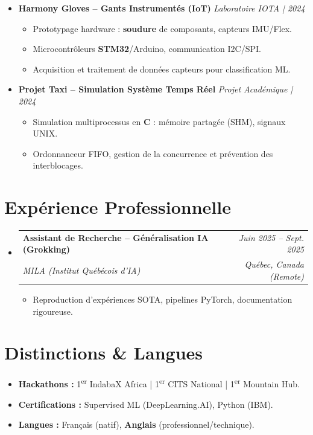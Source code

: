 \documentclass[a4paper,11pt]{article}
\makeatletter
\newcommand{\resumeSubheading}[4]{
  \vspace{-1pt}\item
    \begin{tabular*}{0.97\textwidth}[t]{l@{\extracolsep{\fill}}r}
      \textbf{#1} & \textit{\small #2} \\
      \textit{\small #3} & \textit{\small #4} \\
    \end{tabular*}\vspace{-5pt}
}
\makeatother
\begin{document}
\begin{itemize}[leftmargin=*, label={-}]
\item \textbf{Harmony Gloves -- Gants Instrumentés (IoT)} \hfill \textit{Laboratoire IOTA | 2024}
\vspace{-2pt}
    \begin{itemize}[leftmargin=0.4cm, nosep, label=\tiny$\bullet$]
        \item \small{Prototypage hardware : \textbf{soudure} de composants, capteurs IMU/Flex.}
        \item \small{Microcontrôleurs \textbf{STM32}/Arduino, communication I2C/SPI.}
        \item \small{Acquisition et traitement de données capteurs pour classification ML.}
    \end{itemize}
\vspace{3pt}

\item \textbf{Projet Taxi -- Simulation Système Temps Réel} \hfill \textit{Projet Académique | 2024}
\vspace{-2pt}
    \begin{itemize}[leftmargin=0.4cm, nosep, label=\tiny$\bullet$]
        \item \small{Simulation multiprocessus en \textbf{C} : mémoire partagée (SHM), signaux UNIX.}
        \item \small{Ordonnanceur FIFO, gestion de la concurrence et prévention des interblocages.}
    \end{itemize}

\end{itemize}

\section{Expérience Professionnelle}
\begin{itemize}[leftmargin=*, label={-}]
    \resumeSubheading
      {Assistant de Recherche -- Généralisation IA (Grokking)}{Juin 2025 -- Sept. 2025}
      {MILA (Institut Québécois d'IA)}{Québec, Canada (Remote)}
      \begin{itemize}[leftmargin=0.4cm, nosep, label=\tiny$\bullet$]
        \item \small{Reproduction d'expériences SOTA, pipelines PyTorch, documentation rigoureuse.}
      \end{itemize}
\end{itemize}

\section{Distinctions \& Langues}
\begin{itemize}[leftmargin=*, nosep]
    \item \textbf{Hackathons :} 1\textsuperscript{er} IndabaX Africa | 1\textsuperscript{er} CITS National | 1\textsuperscript{er} Mountain Hub.
    \item \textbf{Certifications :} Supervised ML (DeepLearning.AI), Python (IBM).
    \item \textbf{Langues :} Français (natif), \textbf{Anglais} (professionnel/technique).
\end{itemize}
\end{document}

